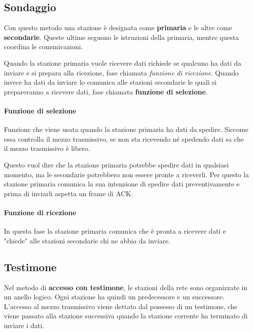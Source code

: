     \subsection{Sondaggio}
        Con questo metodo una stazione è designata come \textbf{primaria} e le altre come \textbf{secondarie}. Queste ultime seguono le istruzioni della primaria, mentre questa coordina le comunicazioni.
        
        Quando la stazione primaria vuole ricevere dati richiede se qualcuno ha dati da inviare e si prepara alla ricezione, fase chiamata \textit{funzione di ricezione}. Quando invece ha dati da inviare lo comunica alle stazioni secondarie le quali si prepareranno a ricevere dati, fase chiamata \textbf{funzione di selezione}.

        \paragraph{Funzione di selezione}
            Funzione che viene usata quando la stazione primaria ha dati da spedire. Siccome essa controlla il mezzo trasmissivo, se non sta ricevendo né spedendo dati sa che il mezzo trasmissivo è libero.
            
            Questo vuol dire che la stazione primaria potrebbe spedire dati in qualsiasi momento, ma le secondarie potrebbero non essere pronte a riceverli. Per questo la stazione primaria comunica la sua intenzione di spedire dati preventivamente e prima di inviarli aspetta un frame di ACK.
            
        \paragraph{Funzione di ricezione}
            In questa fase la stazione primaria comunica che è pronta a ricevere dati e "chiede" alle stazioni secondarie chi ne abbia da inviare.
            
    \subsection{Testimone}
        Nel metodo di \textbf{accesso con testimone}, le stazioni della rete sono organizzate in un anello logico. Ogni stazione ha quindi un predecessore e un successore. L'accesso al mezzo trasmissivo viene dettato dal possesso di un testimone, che viene passato alla stazione successiva quando la stazione corrente ha terminato di inviare i dati.
        
